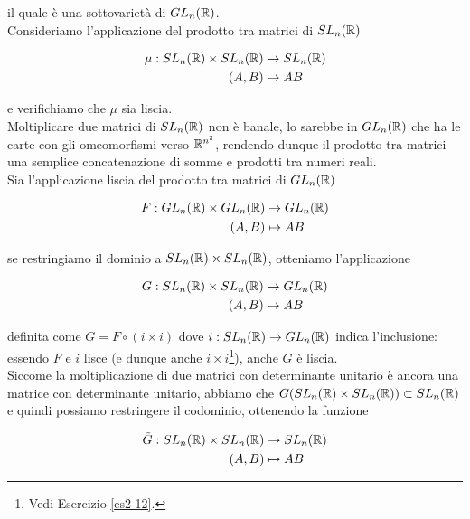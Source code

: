 il quale è una sottovarietà di $ GL_{n}(\mathbb{R}) $.\\
Consideriamo l'applicazione del prodotto tra matrici di $ SL_{n}(\mathbb{R}) $

\begin{align}
	\begin{split}
		\mu : SL_{n}(\mathbb{R}) \times SL_{n}(\mathbb{R}) &\to SL_{n}(\mathbb{R})\\
		(A,B) &\mapsto A B
	\end{split}
\end{align}

e verifichiamo che $ \mu $ sia liscia.\\
Moltiplicare due matrici di $ SL_{n}(\mathbb{R}) $ non è banale, lo sarebbe in $ GL_{n}(\mathbb{R}) $ che ha le carte con gli omeomorfismi verso $ \mathbb{R}^{n^{2}} $, rendendo dunque il prodotto tra matrici una semplice concatenazione di somme e prodotti tra numeri reali.\\
Sia l'applicazione liscia del prodotto tra matrici di $ GL_{n}(\mathbb{R}) $

\begin{align}
	\begin{split}
		F : GL_{n}(\mathbb{R}) \times GL_{n}(\mathbb{R}) &\to GL_{n}(\mathbb{R})\\
		(A,B) &\mapsto A B
	\end{split}
\end{align}

se restringiamo il dominio a $ SL_{n}(\mathbb{R}) \times SL_{n}(\mathbb{R}) $, otteniamo l'applicazione

\begin{align}
	\begin{split}
		G : SL_{n}(\mathbb{R}) \times SL_{n}(\mathbb{R}) &\to GL_{n}(\mathbb{R})\\
		(A,B) &\mapsto A B
	\end{split}
\end{align}

definita come $ G = F \circ (i \times i) $ dove $ i : SL_{n}(\mathbb{R}) \to GL_{n}(\mathbb{R}) $ indica l'inclusione: essendo $ F $ e $ i $ lisce (e dunque anche $ i \times i $\footnote{%
	Vedi Esercizio \ref{es2-12}.%
}), anche $ G $ è liscia.\\
Siccome la moltiplicazione di due matrici con determinante unitario è ancora una matrice con determinante unitario, abbiamo che $ G(SL_{n}(\mathbb{R}) \times SL_{n}(\mathbb{R})) \subset SL_{n}(\mathbb{R}) $ e quindi possiamo restringere il codominio, ottenendo la funzione

\begin{align}
	\begin{split}
		\tilde{G} : SL_{n}(\mathbb{R}) \times SL_{n}(\mathbb{R}) &\to SL_{n}(\mathbb{R})\\
		(A,B) &\mapsto A B
	\end{split}
\end{align}

